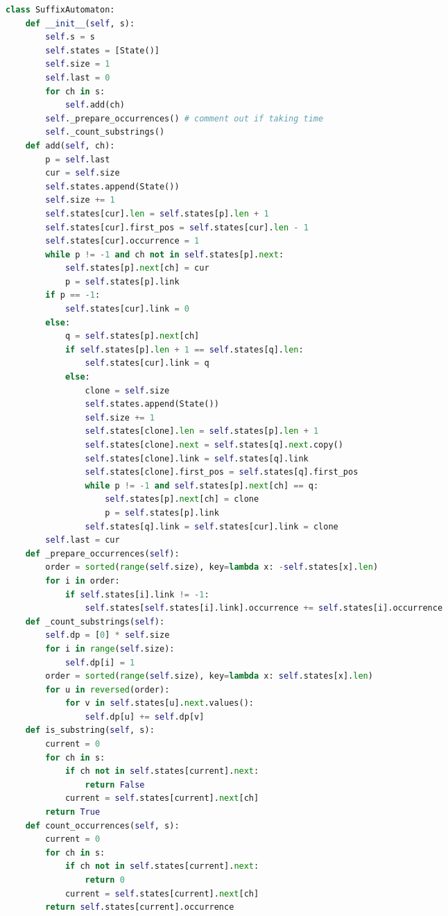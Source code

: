 \documentclass[10pt,landscape, a4paper]{article}
\begin{document}
\begin{multicols*}{3}
\begin{lstlisting}[language=Python]
class SuffixAutomaton:
    def __init__(self, s):
        self.s = s
        self.states = [State()]
        self.size = 1
        self.last = 0
        for ch in s:
            self.add(ch)
        self._prepare_occurrences() # comment out if taking time
        self._count_substrings()
    def add(self, ch):
        p = self.last
        cur = self.size
        self.states.append(State())
        self.size += 1
        self.states[cur].len = self.states[p].len + 1
        self.states[cur].first_pos = self.states[cur].len - 1
        self.states[cur].occurrence = 1
        while p != -1 and ch not in self.states[p].next:
            self.states[p].next[ch] = cur
            p = self.states[p].link
        if p == -1:
            self.states[cur].link = 0
        else:
            q = self.states[p].next[ch]
            if self.states[p].len + 1 == self.states[q].len:
                self.states[cur].link = q
            else:
                clone = self.size
                self.states.append(State())
                self.size += 1
                self.states[clone].len = self.states[p].len + 1
                self.states[clone].next = self.states[q].next.copy()
                self.states[clone].link = self.states[q].link
                self.states[clone].first_pos = self.states[q].first_pos
                while p != -1 and self.states[p].next[ch] == q:
                    self.states[p].next[ch] = clone
                    p = self.states[p].link
                self.states[q].link = self.states[cur].link = clone
        self.last = cur
    def _prepare_occurrences(self):
        order = sorted(range(self.size), key=lambda x: -self.states[x].len)
        for i in order:
            if self.states[i].link != -1:
                self.states[self.states[i].link].occurrence += self.states[i].occurrence
    def _count_substrings(self):
        self.dp = [0] * self.size
        for i in range(self.size):
            self.dp[i] = 1
        order = sorted(range(self.size), key=lambda x: self.states[x].len)
        for u in reversed(order):
            for v in self.states[u].next.values():
                self.dp[u] += self.dp[v]
    def is_substring(self, s):
        current = 0
        for ch in s:
            if ch not in self.states[current].next:
                return False
            current = self.states[current].next[ch]
        return True
    def count_occurrences(self, s):
        current = 0
        for ch in s:
            if ch not in self.states[current].next:
                return 0
            current = self.states[current].next[ch]
        return self.states[current].occurrence

\end{lstlisting}
\end{multicols*}
\end{document}
